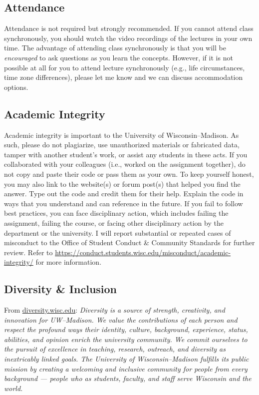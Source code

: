 \documentclass[11pt,]{article}
\begin{document}
\hypertarget{attendance}{%
\subsection{Attendance}\label{attendance}}

Attendance is not required but strongly recommended. If you cannot
attend class synchronously, you should watch the video recordings of the
lectures in your own time. The advantage of attending class
synchronously is that you will be \emph{encouraged} to ask questions as
you learn the concepts. However, if it is not possible at all for you to
attend lecture synchronously (e.g., life circumstances, time zone
differences), please let me know and we can discuss accommodation
options.

\hypertarget{academic-integrity}{%
\subsection{Academic Integrity}\label{academic-integrity}}

Academic integrity is important to the University of Wisconsin--Madison.
As such, please do not plagiarize, use unauthorized materials or
fabricated data, tamper with another student's work, or assist any
students in these acts. If you collaborated with your colleagues (i.e.,
worked on the assignment together), do not copy and paste their code or
pass them as your own. To keep yourself honest, you may also link to the
website(s) or forum post(s) that helped you find the answer. Type out
the code and credit them for their help. Explain the code in ways that
you understand and can reference in the future. If you fail to follow
best practices, you can face disciplinary action, which includes failing
the assignment, failing the course, or facing other disciplinary action
by the department or the university. I will report substantial or
repeated cases of misconduct to the Office of Student Conduct \&
Community Standards for further review. Refer to
\url{https://conduct.students.wisc.edu/misconduct/academic-integrity/}
for more information.

\hypertarget{diversity-inclusion}{%
\subsection{Diversity \& Inclusion}\label{diversity-inclusion}}

From \href{https://diversity.wisc.edu/}{diversity.wisc.edu}:
\emph{Diversity is a source of strength, creativity, and innovation for
UW--Madison. We value the contributions of each person and respect the
profound ways their identity, culture, background, experience, status,
abilities, and opinion enrich the university community. We commit
ourselves to the pursuit of excellence in teaching, research, outreach,
and diversity as inextricably linked goals. The University of
Wisconsin--Madison fulfills its public mission by creating a welcoming
and inclusive community for people from every background --- people who
as students, faculty, and staff serve Wisconsin and the world.}
\end{document}
